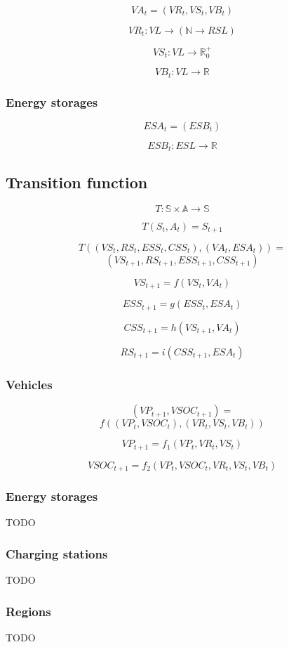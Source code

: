\[
	VA_t = (VR_t, VS_t, VB_t)
\]

\[
	VR_t: VL \rightarrow (\mathbb{N} \rightarrow RSL)
\]

\[
	VS_t: VL \rightarrow \mathbb{R}_0^+
\]

\[
	VB_t: VL \rightarrow \mathbb{R}
\]

\subsubsection{Energy storages}

\[
	ESA_t = (ESB_t)
\]

\[
	ESB_t: ESL \rightarrow \mathbb{R}
\]

\subsection{Transition function}

\[
	T: \mathbb{S} \times \mathbb{A} \rightarrow \mathbb{S}
\]

\[
	T(S_t, A_t) = S_{t+1}
\]

\[
	T((VS_t, RS_t, ESS_t, CSS_t), (VA_t, ESA_t)) = 
\]
\[
	(VS_{t+1}, RS_{t+1}, ESS_{t+1}, CSS_{t+1})
\]

\[
	VS_{t+1} = f(VS_t, VA_t)
\]

\[
	ESS_{t+1} = g(ESS_t, ESA_t)	
\]

\[
	CSS_{t+1} = h(VS_{t+1}, VA_t)
\]

\[
	RS_{t+1} = i(CSS_{t+1}, ESA_t)
\]

\subsubsection{Vehicles}

\[
	(VP_{t+1}, VSOC_{t+1}) =
\]
\[
	f((VP_t, VSOC_t), (VR_t, VS_t, VB_t))
\]

\[
	VP_{t+1} = f_1(VP_t, VR_t, VS_t)
\]

\[
	VSOC_{t+1} = f_2(VP_t, VSOC_t, VR_t, VS_t, VB_t)
\]

\subsubsection{Energy storages}

TODO

\subsubsection{Charging stations}

TODO

\subsubsection{Regions}

TODO